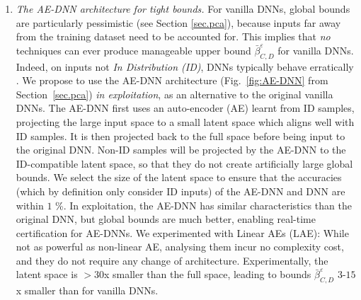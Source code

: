 \begin{enumerate}

	\item {\em The AE-DNN architecture for tight bounds.} 
	For vanilla DNNs, global bounds are particularly pessimistic (see Section \ref{sec.pca}), because inputs far away from the training dataset need to be accounted for. This implies that {\em no} techniques can ever produce manageable upper bound $\bar{\beta}^\varepsilon_{C,D}$ for vanilla DNNs.
	Indeed, on inputs not {\em In Distribution (ID)}, DNNs typically behave erratically \citep{OOD}.
	We propose to use the AE-DNN architecture (Fig.~\ref{fig:AE-DNN} from 
	Section~\ref{sec.pca}) {\em in exploitation}, as an alternative
	to the original vanilla DNNs.
	The AE-DNN first uses an auto-encoder (AE) learnt from ID samples, projecting the large input space to a small latent space which aligns well with ID samples. 
	It is then projected back to the full space before being input to the original DNN. Non-ID samples will be projected by the AE-DNN to the ID-compatible latent space, so that they do not create artificially large global bounds. We select the size of the latent space to ensure that the accuracies (which by definition only consider ID inputs) of the AE-DNN and DNN are within $1$ \%. In exploitation, the AE-DNN has similar characteristics than the original DNN,  but global bounds are much better, enabling real-time certification for AE-DNNs.
	We experimented with Linear AEs (LAE): While not as powerful as non-linear AE, analysing them incur no complexity cost, and they do not require any change of architecture. Experimentally, the latent space is $>30$x smaller than the full space, leading to bounds $\bar{\beta}^\varepsilon_{C,D}$ $3$-$15$x smaller than for vanilla DNNs.



\end{enumerate}

